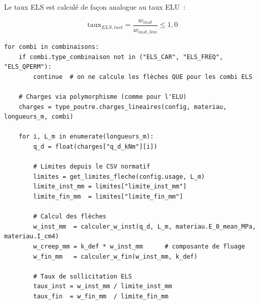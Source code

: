 Le taux ELS est calcul\'e de fa\c{c}on analogue au taux ELU~:

\begin{equation}
\text{taux}_{ELS,inst} = \frac{w_{inst}}{w_{inst,lim}}
\leq 1{,}0
\end{equation}

\begin{lstlisting}[style=python, caption={Extrait de \fichier{ec5/els.py} --- boucle de vérification ELS}]
for combi in combinaisons:
    if combi.type_combinaison not in ("ELS_CAR", "ELS_FREQ", "ELS_QPERM"):
        continue  # on ne calcule les flèches QUE pour les combi ELS

    # Charges via polymorphisme (comme pour l'ELU)
    charges = type_poutre.charges_lineaires(config, materiau, longueurs_m, combi)

    for i, L_m in enumerate(longueurs_m):
        q_d = float(charges["q_d_kNm"][i])

        # Limites depuis le CSV normatif
        limites = get_limites_fleche(config.usage, L_m)
        limite_inst_mm = limites["limite_inst_mm"]
        limite_fin_mm  = limites["limite_fin_mm"]

        # Calcul des flèches
        w_inst_mm  = calculer_w_inst(q_d, L_m, materiau.E_0_mean_MPa, materiau.I_cm4)
        w_creep_mm = k_def * w_inst_mm      # composante de fluage
        w_fin_mm   = calculer_w_fin(w_inst_mm, k_def)

        # Taux de sollicitation ELS
        taux_inst = w_inst_mm / limite_inst_mm
        taux_fin  = w_fin_mm  / limite_fin_mm
\end{lstlisting}